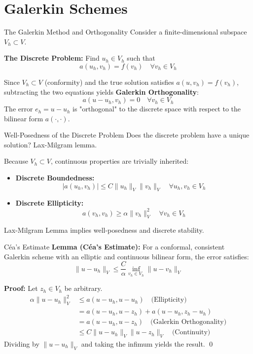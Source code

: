 \documentclass[aspectratio=169]{beamer}
\begin{document}
\section{Galerkin Schemes}

\begin{frame}{The Galerkin Method and Orthogonality}
    Consider a finite-dimensional subspace $V_h \subset V$.
    
    \vspace{0.2cm}
    \textbf{The Discrete Problem:} Find $u_h \in V_h$ such that
    $$ a(u_h, v_h) = f(v_h) \quad \forall v_h \in V_h $$
    
    \vspace{0.2cm}
    Since $V_h \subset V$ (conformity) and the true solution satisfies $a(u, v_h) = f(v_h)$, subtracting the two equations yields \textbf{Galerkin Orthogonality}:
    $$ a(u - u_h, v_h) = 0 \quad \forall v_h \in V_h $$
    The error $e_h = u - u_h$ is "orthogonal" to the discrete space with respect to the bilinear form $a(\cdot, \cdot)$.
\end{frame}

\begin{frame}{Well-Posedness of the Discrete Problem}
    Does the discrete problem have a unique solution? Lax-Milgram lemma.
    
    \vspace{0.2cm}
    Because $V_h \subset V$, continuous properties are trivially inherited:
    \begin{itemize}
        \item \textbf{Discrete Boundedness:} 
        $$ |a(u_h, v_h)| \le C \|u_h\|_V \|v_h\|_V \quad \forall u_h, v_h \in V_h $$
        \item \textbf{Discrete Ellipticity:} 
        $$ a(v_h, v_h) \ge \alpha \|v_h\|^2_V \quad \forall v_h \in V_h $$
    \end{itemize}
    
    \vspace{0.2cm}
    Lax-Milgram Lemma implies well-posedness and discrete stability.
\end{frame}

\begin{frame}{C\'ea's Estimate}
    \textbf{Lemma (C\'ea's Estimate):} For a conformal, consistent Galerkin scheme with an elliptic and continuous bilinear form, the error satisfies:
    $$ \|u - u_h\|_V \le \frac{C}{\alpha} \inf_{v_h \in V_h} \|u - v_h\|_V $$
    
    \textbf{Proof:} Let $z_h \in V_h$ be arbitrary.
    \begin{align*}
        \alpha \|u - u_h\|_V^2 &\le a(u - u_h, u - u_h) \quad \text{(Ellipticity)} \\
        &= a(u - u_h, u - z_h) + a(u - u_h, z_h - u_h) \\
        &= a(u - u_h, u - z_h) \quad \text{(Galerkin Orthogonality)} \\
        &\le C \|u - u_h\|_V \|u - z_h\|_V \quad \text{(Continuity)}
    \end{align*}
    Dividing by $\|u - u_h\|_V$ and taking the infimum yields the result. \qed
\end{frame}
\end{document}

